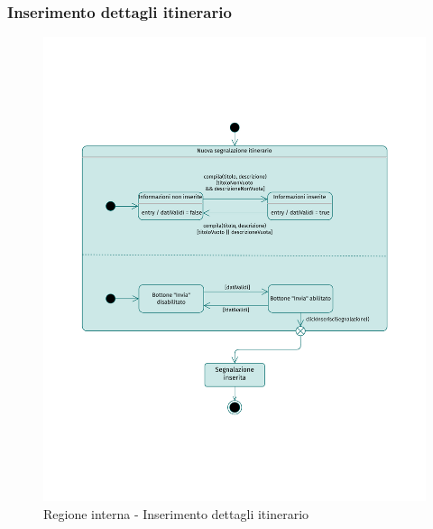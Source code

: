 \documentclass{natourDoc}
\begin{document}
	\subsubsection{Inserimento dettagli itinerario}
	\begin{figure}[!htbp]
		\centering
		\includegraphics[width=\textwidth, page=3]{./diagrams/statechart.pdf}
		\caption{Regione interna - Inserimento dettagli itinerario}
	\end{figure}
	\FloatBarrier

	\newpage
\end{document}
